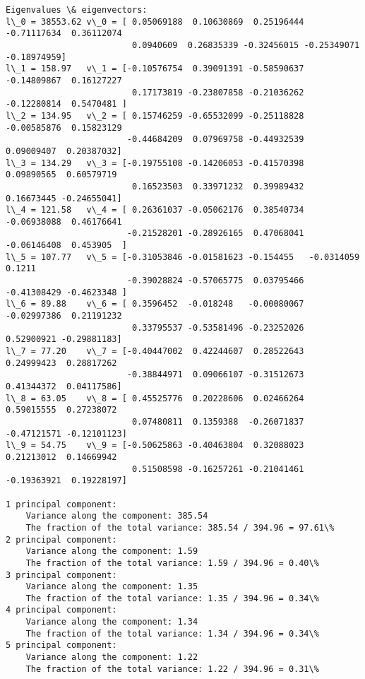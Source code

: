 \begin{Verbatim}[commandchars=\\\{\}]
Eigenvalues \& eigenvectors:
l\_0 = 38553.62	v\_0 = [ 0.05069188  0.10630869  0.25196444 -0.71117634  0.36112074 
                         0.0940609  0.26835339 -0.32456015 -0.25349071 -0.18974959]
l\_1 = 158.97	v\_1 = [-0.10576754  0.39091391 -0.58590637 -0.14809867  0.16127227 
                         0.17173819 -0.23807858 -0.21036262 -0.12280814  0.5470481 ]
l\_2 = 134.95	v\_2 = [ 0.15746259 -0.65532099 -0.25118828 -0.00585876  0.15823129 
                        -0.44684209  0.07969758 -0.44932539  0.09009407  0.20387032]
l\_3 = 134.29	v\_3 = [-0.19755108 -0.14206053 -0.41570398  0.09890565  0.60579719 
                         0.16523503  0.33971232  0.39989432  0.16673445 -0.24655041]
l\_4 = 121.58	v\_4 = [ 0.26361037 -0.05062176  0.38540734 -0.06938088  0.46176641 
                        -0.21528201 -0.28926165  0.47068041 -0.06146408  0.453905  ]
l\_5 = 107.77	v\_5 = [-0.31053846 -0.01581623 -0.154455   -0.0314059   0.1211     
                        -0.39028824 -0.57065775  0.03795466 -0.41308429 -0.4623348 ]
l\_6 = 89.88	v\_6 = [ 0.3596452  -0.018248   -0.00080067 -0.02997386  0.21191232 
                         0.33795537 -0.53581496 -0.23252026  0.52900921 -0.29881183]
l\_7 = 77.20	v\_7 = [-0.40447002  0.42244607  0.28522643  0.24999423  0.28817262 
                        -0.38844971  0.09066107 -0.31512673  0.41344372  0.04117586]
l\_8 = 63.05	v\_8 = [ 0.45525776  0.20228606  0.02466264  0.59015555  0.27238072 
                         0.07480811  0.1359388  -0.26071837 -0.47121571 -0.12101123]
l\_9 = 54.75	v\_9 = [-0.50625863 -0.40463804  0.32088023  0.21213012  0.14669942 
                         0.51508598 -0.16257261 -0.21041461 -0.19363921  0.19228197]

1 principal component:
	Variance along the component: 385.54
	The fraction of the total variance: 385.54 / 394.96 = 97.61\%
2 principal component:
	Variance along the component: 1.59
	The fraction of the total variance: 1.59 / 394.96 = 0.40\%
3 principal component:
	Variance along the component: 1.35
	The fraction of the total variance: 1.35 / 394.96 = 0.34\%
4 principal component:
	Variance along the component: 1.34
	The fraction of the total variance: 1.34 / 394.96 = 0.34\%
5 principal component:
	Variance along the component: 1.22
	The fraction of the total variance: 1.22 / 394.96 = 0.31\%

    \end{Verbatim}

